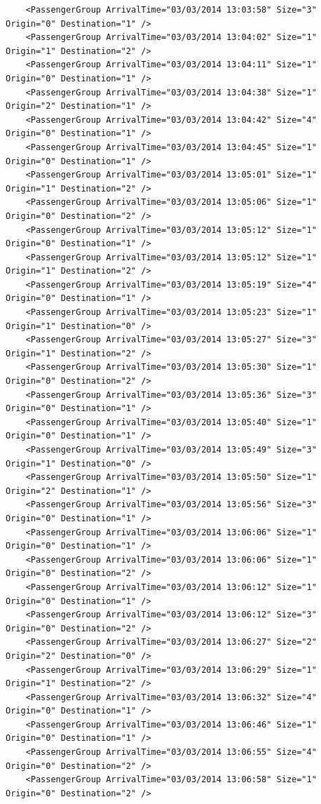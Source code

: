 \documentclass{UoYCSproject}
\begin{document}
\begin{lstlisting}
	<PassengerGroup ArrivalTime="03/03/2014 13:03:58" Size="3" Origin="0" Destination="1" />
	<PassengerGroup ArrivalTime="03/03/2014 13:04:02" Size="1" Origin="1" Destination="2" />
	<PassengerGroup ArrivalTime="03/03/2014 13:04:11" Size="1" Origin="0" Destination="1" />
	<PassengerGroup ArrivalTime="03/03/2014 13:04:38" Size="1" Origin="2" Destination="1" />
	<PassengerGroup ArrivalTime="03/03/2014 13:04:42" Size="4" Origin="0" Destination="1" />
	<PassengerGroup ArrivalTime="03/03/2014 13:04:45" Size="1" Origin="0" Destination="1" />
	<PassengerGroup ArrivalTime="03/03/2014 13:05:01" Size="1" Origin="1" Destination="2" />
	<PassengerGroup ArrivalTime="03/03/2014 13:05:06" Size="1" Origin="0" Destination="2" />
	<PassengerGroup ArrivalTime="03/03/2014 13:05:12" Size="1" Origin="0" Destination="1" />
	<PassengerGroup ArrivalTime="03/03/2014 13:05:12" Size="1" Origin="1" Destination="2" />
	<PassengerGroup ArrivalTime="03/03/2014 13:05:19" Size="4" Origin="0" Destination="1" />
	<PassengerGroup ArrivalTime="03/03/2014 13:05:23" Size="1" Origin="1" Destination="0" />
	<PassengerGroup ArrivalTime="03/03/2014 13:05:27" Size="3" Origin="1" Destination="2" />
	<PassengerGroup ArrivalTime="03/03/2014 13:05:30" Size="1" Origin="0" Destination="2" />
	<PassengerGroup ArrivalTime="03/03/2014 13:05:36" Size="3" Origin="0" Destination="1" />
	<PassengerGroup ArrivalTime="03/03/2014 13:05:40" Size="1" Origin="0" Destination="1" />
	<PassengerGroup ArrivalTime="03/03/2014 13:05:49" Size="3" Origin="1" Destination="0" />
	<PassengerGroup ArrivalTime="03/03/2014 13:05:50" Size="1" Origin="2" Destination="1" />
	<PassengerGroup ArrivalTime="03/03/2014 13:05:56" Size="3" Origin="0" Destination="1" />
	<PassengerGroup ArrivalTime="03/03/2014 13:06:06" Size="1" Origin="0" Destination="1" />
	<PassengerGroup ArrivalTime="03/03/2014 13:06:06" Size="1" Origin="0" Destination="2" />
	<PassengerGroup ArrivalTime="03/03/2014 13:06:12" Size="1" Origin="0" Destination="1" />
	<PassengerGroup ArrivalTime="03/03/2014 13:06:12" Size="3" Origin="0" Destination="2" />
	<PassengerGroup ArrivalTime="03/03/2014 13:06:27" Size="2" Origin="2" Destination="0" />
	<PassengerGroup ArrivalTime="03/03/2014 13:06:29" Size="1" Origin="1" Destination="2" />
	<PassengerGroup ArrivalTime="03/03/2014 13:06:32" Size="4" Origin="0" Destination="1" />
	<PassengerGroup ArrivalTime="03/03/2014 13:06:46" Size="1" Origin="0" Destination="1" />
	<PassengerGroup ArrivalTime="03/03/2014 13:06:55" Size="4" Origin="0" Destination="2" />
	<PassengerGroup ArrivalTime="03/03/2014 13:06:58" Size="1" Origin="0" Destination="2" />

\end{lstlisting}
\end{document}
